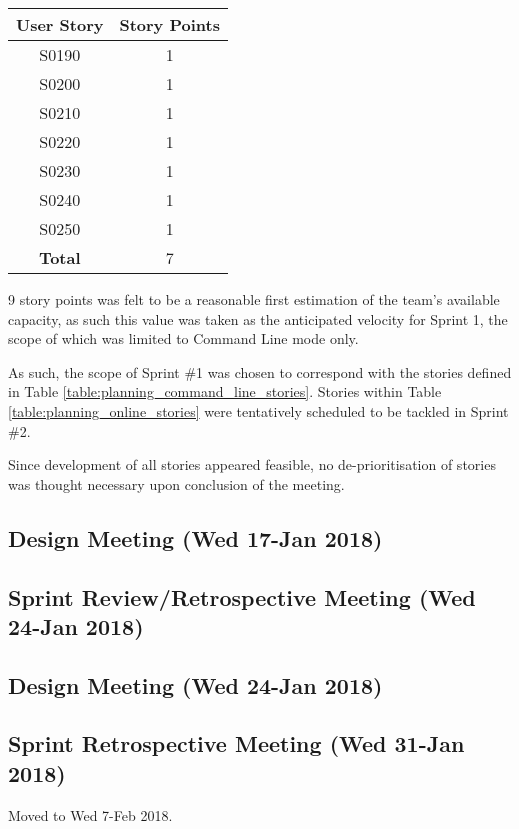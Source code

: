 \begin{center}
	\begin{tabular}{*{2}c}
		\hline
		\textbf{User Story} & \textbf{Story Points} \\
		\hline
		S0190 & 1 \\
		S0200 & 1 \\
		S0210 & 1 \\
		S0220 & 1 \\
		S0230 & 1 \\
		S0240 & 1 \\
		S0250 & 1 \\
		\hline
		\textbf{Total} & 7 \\
		\hline
	\end{tabular}
	\label{table:planning_online_stories}
\end{center}

9 story points was felt to be a reasonable first estimation of the team's available capacity, as such this value was taken as the anticipated velocity for Sprint 1, the scope of which was limited to Command Line mode only.

As such, the scope of Sprint \#1 was chosen to correspond with the stories defined in Table \ref{table:planning_command_line_stories}. Stories within Table \ref{table:planning_online_stories} were tentatively scheduled to be tackled in Sprint \#2.

Since development of all stories appeared feasible, no de-prioritisation of stories was thought necessary upon conclusion of the meeting.


\subsection{Design Meeting (Wed 17-Jan 2018)}


\subsection{Sprint Review/Retrospective Meeting (Wed 24-Jan 2018)}


\subsection{Design Meeting (Wed 24-Jan 2018)}


\subsection{Sprint Retrospective Meeting (Wed 31-Jan 2018)}

Moved to Wed 7-Feb 2018.
